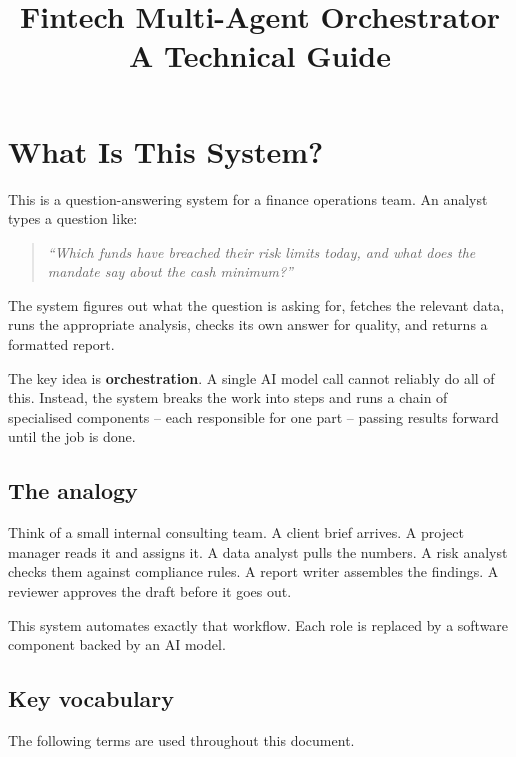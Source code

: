\documentclass[12pt,a4paper]{article}
\title{\textbf{Fintech Multi-Agent Orchestrator}\\[0.4em]
       \large A Technical Guide}
\author{}
\date{}
\begin{document}
\maketitle
\tableofcontents
\newpage


\section{What Is This System?}

This is a question-answering system for a finance operations team. An analyst types a question like:

\begin{quote}
\textit{``Which funds have breached their risk limits today, and what does the mandate say about the cash minimum?''}
\end{quote}

The system figures out what the question is asking for, fetches the relevant data, runs the appropriate analysis, checks its own answer for quality, and returns a formatted report.

The key idea is \textbf{orchestration}. A single AI model call cannot reliably do all of this. Instead, the system breaks the work into steps and runs a chain of specialised components -- each responsible for one part -- passing results forward until the job is done.

\subsection{The analogy}

Think of a small internal consulting team. A client brief arrives. A project manager reads it and assigns it. A data analyst pulls the numbers. A risk analyst checks them against compliance rules. A report writer assembles the findings. A reviewer approves the draft before it goes out.

This system automates exactly that workflow. Each role is replaced by a software component backed by an AI model.

\subsection{Key vocabulary}

The following terms are used throughout this document.
\end{document}
